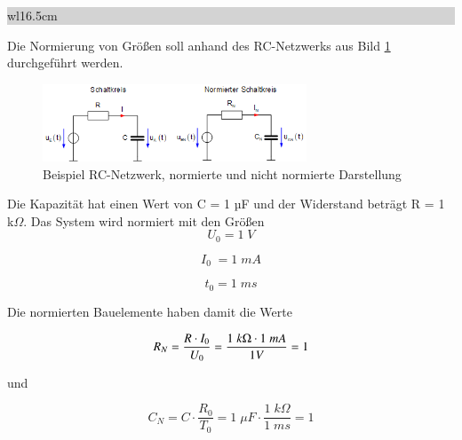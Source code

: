 \noindent
\colorbox{lightgray}{%
%
\renewcommand\arraystretch{0.6}%
\begin{tabular}{ wl{16.5cm} }
{\selectfont
{}}
\end{tabular}%
}\bigskip


\noindent Die Normierung von Gr\"{o}{\ss}en soll anhand des RC-Netzwerks aus Bild \ref{fig:RCNETZWERK} durchgef\"{u}hrt werden. 

\noindent 

\begin{figure}[ht]
  \centerline{\includegraphics[width=0.7\textwidth]{Kapitel1/Bilder/image27}}
  \caption{Beispiel RC-Netzwerk, normierte und nicht normierte Darstellung }
  \label{fig:RCNETZWERK}
\end{figure}



\noindent Die Kapazit\"{a}t hat einen Wert von C = 1 µF und der Widerstand betr\"{a}gt R = 1 k$\Omega$. Das System wird normiert mit den Gr\"{o}{\ss}en
\begin{equation}\label{eq:onehundredeight}
U_{0} =1  \; V
\end{equation}

\begin{equation}\label{eq:onehundrednine}
{I}_{0} \; =1 \;mA
\end{equation}

\begin{equation}\label{eq:onehundredten}
{t}_{0} =1 \; ms
\end{equation}


\noindent Die normierten Bauelemente haben damit die Werte

\begin{equation}\label{eq:onehundredeleven}
R_{N} =\dfrac{R\cdot I_{0} }{U_{0} } =\dfrac{1{\rm \; }k\Omega \cdot 1{\rm \; }mA}{1V} =1
\end{equation}

\noindent und 

\begin{equation}\label{eq:onehundredtwelve}
C_{N} =C\cdot \dfrac{R_{0} }{T_{0} } =1 \; \mu F\cdot \dfrac{1 \; k\Omega }{1 \; ms} =1
\end{equation}


